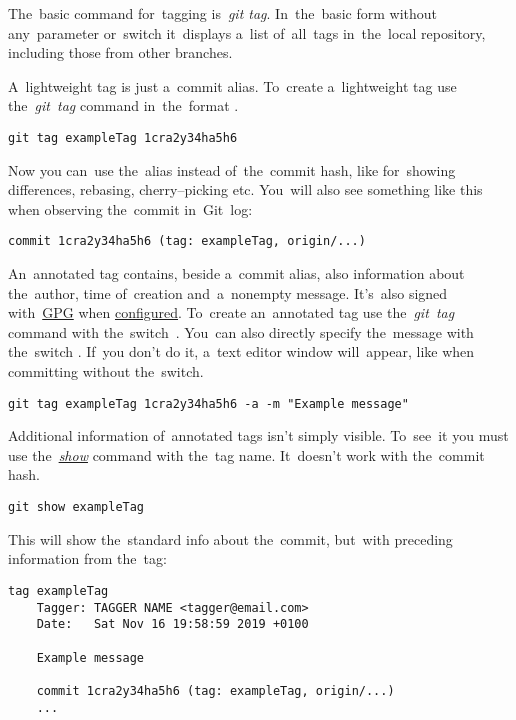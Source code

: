 The~basic command for~tagging is~\textit{git tag}.
In~the~basic form without any~parameter or~switch it~displays a~list of~all~tags in~the~local repository, including those from other branches.

A~lightweight tag is just a~commit alias.
To~create a~lightweight tag use the~\textit{git~tag} command in~the~format .

\example
\begin{lstlisting}[frame=no]
    git tag exampleTag 1cra2y34ha5h6
\end{lstlisting}

\noindent Now you can~use the~alias  instead of~the~commit hash, like for~showing differences, rebasing, cherry--picking etc.
You~will also see something like this when observing the~commit in~Git~log:
\begin{lstlisting}[frame=no]
    commit 1cra2y34ha5h6 (tag: exampleTag, origin/...)
\end{lstlisting}

\noindent An~annotated tag contains, beside a~commit alias, also information about the~author, time of~creation and~a~nonempty message.
It's~also signed with~\hyperref[pgpgpg]{GPG} when \hyperref[gitbasicconfiguration]{configured}.
To~create an~annotated tag use the~\textit{git~tag} command with the~switch~.
You~can also directly specify the~message with the~switch .
If~you don't do it, a~text editor window will~appear, like when committing without the~switch.

\example
\begin{lstlisting}[frame=no]
    git tag exampleTag 1cra2y34ha5h6 -a -m "Example message"
\end{lstlisting}

\noindent Additional information of~annotated tags isn't simply visible.
To~see~it you must use the~\hyperref[gitshow]{\textit{show}} command with the~tag name.
It~doesn't work with the~commit hash.

\example
\begin{lstlisting}[frame=no]
    git show exampleTag
\end{lstlisting}

\noindent This will show the~standard info about the~commit, but~with preceding information from the~tag:
\begin{lstlisting}[frame=no]
    tag exampleTag
    Tagger: TAGGER NAME <tagger@email.com>
    Date:   Sat Nov 16 19:58:59 2019 +0100

    Example message

    commit 1cra2y34ha5h6 (tag: exampleTag, origin/...)
    ...
\end{lstlisting}

